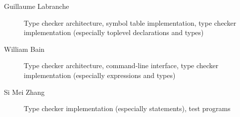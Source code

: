 \documentclass[oneside]{article}
\begin{document}
\begin{description}
    \item[Guillaume Labranche] Type checker architecture, symbol table implementation, type checker implementation (especially toplevel declarations and types)
    \item[William Bain] Type checker architecture, command-line interface, type checker implementation (especially expressions and types)
    \item[Si Mei Zhang] Type checker implementation (especially statements), test programs
\end{description}
\end{document}
